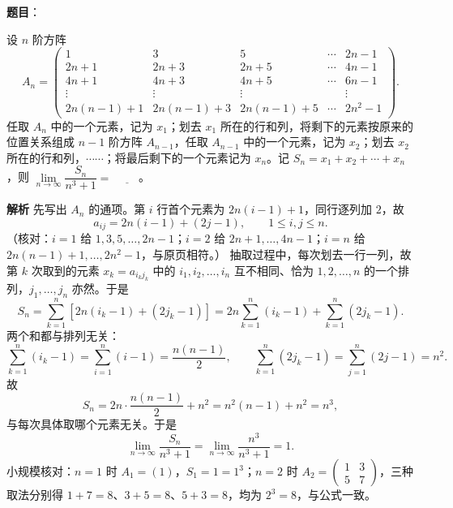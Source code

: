 \begin{answer}

\textbf{题目}：

设 $n$ 阶方阵
\nopagebreak[4]
\[A_n=\begin{pmatrix}
1&3&5&\cdots&2n-1\\
2n+1&2n+3&2n+5&\cdots&4n-1\\
4n+1&4n+3&4n+5&\cdots&6n-1\\
\vdots&\vdots&\vdots&&\vdots\\
2n(n-1)+1&2n(n-1)+3&2n(n-1)+5&\cdots&2n^2-1
\end{pmatrix}.\]
任取 $A_n$ 中的一个元素，记为 $x_1$；划去 $x_1$ 所在的行和列，将剩下的元素按原来的位置关系组成 $n-1$ 阶方阵 $A_{n-1}$，任取 $A_{n-1}$ 中的一个元素，记为 $x_2$；划去 $x_2$ 所在的行和列，$\cdots\cdots$；将最后剩下的一个元素记为 $x_n$。记 $S_n=x_1+x_2+\cdots+x_n$，则 $\lim\limits_{n\to\infty}\dfrac{S_n}{n^3+1}=$ $\underline{\qquad}$。

\textbf{解析}
先写出 $A_n$ 的通项。第 $i$ 行首个元素为 $2n(i-1)+1$，同行逐列加 $2$，故
\nopagebreak[4]
\[a_{ij}=2n\left(i-1\right)+\left(2j-1\right),\qquad 1\le i,j\le n.\]
（核对：$i=1$ 给 $1,3,5,\dots,2n-1$；$i=2$ 给 $2n+1,\dots,4n-1$；$i=n$ 给 $2n(n-1)+1,\dots,2n^2-1$，与原页相符。）
抽取过程中，每次划去一行一列，故第 $k$ 次取到的元素 $x_k=a_{i_kj_k}$ 中的 $i_1,i_2,\dots,i_n$ 互不相同、恰为 $1,2,\dots,n$ 的一个排列，$j_1,\dots,j_n$ 亦然。于是
\nopagebreak[4]
\[S_n=\sum_{k=1}^{n}\left[2n\left(i_k-1\right)+\left(2j_k-1\right)\right]
=2n\sum_{k=1}^{n}\left(i_k-1\right)+\sum_{k=1}^{n}\left(2j_k-1\right).\]
两个和都与排列无关：
\nopagebreak[4]
\[\sum_{k=1}^{n}\left(i_k-1\right)=\sum_{i=1}^{n}\left(i-1\right)=\frac{n(n-1)}{2},\qquad
\sum_{k=1}^{n}\left(2j_k-1\right)=\sum_{j=1}^{n}\left(2j-1\right)=n^2.\]
故
\nopagebreak[4]
\[S_n=2n\cdot\frac{n(n-1)}{2}+n^2=n^2(n-1)+n^2=n^3,\]
与每次具体取哪个元素无关。于是
\nopagebreak[4]
\[\lim_{n\to\infty}\frac{S_n}{n^3+1}=\lim_{n\to\infty}\frac{n^3}{n^3+1}=1.\]
小规模核对：$n=1$ 时 $A_1=(1)$，$S_1=1=1^3$；$n=2$ 时 $A_2=\begin{pmatrix}1&3\\5&7\end{pmatrix}$，三种取法分别得 $1+7=8$、$3+5=8$、$5+3=8$，均为 $2^3=8$，与公式一致。


\end{answer}
